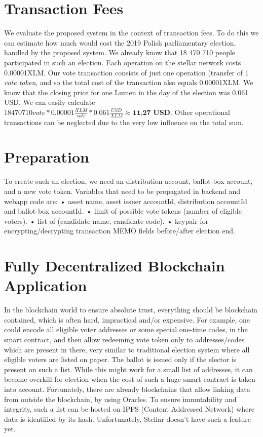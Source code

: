 \documentclass[runningheads]{llncs}
\begin{document}
\section{Transaction Fees}
We evaluate the proposed system in the context of transaction fees. To do this we can estimate how much would cost the 2019 Polish parliamentary election, handled by the proposed system. We already know that 18 470 710 people participated in such an election. Each operation on the stellar network costs 0.00001XLM. Our vote transaction consists of just one operation (transfer of 1 \textit{vote token}, and so the total cost of the transaction also equals 0.00001XLM. We know that the closing price for one Lumen in the day of the election was 0.061 USD. We can easily calculate \(18470710 vote * 0.00001 \frac{XLM}{vote} * 0.061 \frac{USD}{XLM} \approx \textbf{11,27 USD}\). Other operational transactions can be neglected due to the very low influence on the total sum.

\section{Preparation}
To create such an election, we need an distribution account, ballot-box account, and a new vote token. Variables that need to be propagated in backend and webapp code are:
• asset name, asset issuer accountId, distribution accountId and ballot-box accountId.
• limit of possible vote tokens (number of eligible voters). 
• list of (candidate name, candidate code).
• keypair for encrypting/decrypting transaction MEMO fields before/after election end.


\section{Fully Decentralized Blockchain Application}
In the blockchain world to ensure absolute trust, everything should be blockchain contained, which is often hard, impractical and/or expensive. For example, one could encode all eligible voter addresses or some special one-time codes, in the smart contract, and then allow redeeming vote token only to addresses/codes which are present in there, very similar to traditional election system where all eligible voters are listed on paper. The ballot is issued only if the elector is present on such a list. While this might work for a small list of addresses, it can become overkill for election when the cost of such a huge smart contract is taken into account. Fortunately, there are already blockchains that allow linking data from outside the blockchain, by using Oracles. To ensure immutability and integrity, such a list can be hosted on IPFS (Content Addressed Network) where data is identified by its hash. Unfortunately, Stellar doesn't have such a feature yet.
\end{document}
